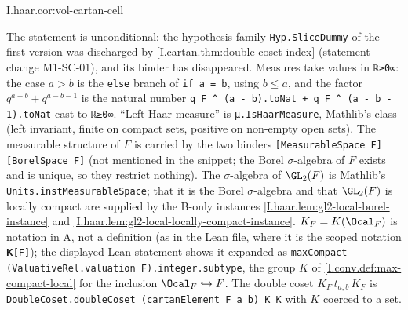 \begin{tfformal}{I.haar.cor:vol-cartan-cell}
\begin{tffidelity}
The statement is unconditional: the hypothesis family \texttt{Hyp.SliceDummy} of the first version was discharged by \cref{I.cartan.thm:double-coset-index} (statement change M1-SC-01), and its binder has disappeared. Measures take values in \texttt{ℝ≥0∞}: the case $a>b$ is the \texttt{else} branch of \texttt{if a = b}, using $b\le a$, and the factor $q^{a-b}+q^{a-b-1}$ is the natural number \texttt{q F \^{} (a - b).toNat + q F \^{} (a - b - 1).toNat} cast to \texttt{ℝ≥0∞}. ``Left Haar measure'' is \texttt{μ.IsHaarMeasure}, Mathlib's class (left invariant, finite on compact sets, positive on non-empty open sets). The measurable structure of $F$ is carried by the two binders \texttt{[MeasurableSpace F] [BorelSpace F]} (not mentioned in the snippet; the Borel $\sigma$-algebra of $F$ exists and is unique, so they restrict nothing). The $\sigma$-algebra of $\GL_2(F)$ is Mathlib's \texttt{Units.instMeasurableSpace}; that it is the Borel $\sigma$-algebra and that $\GL_2(F)$ is locally compact are supplied by the B-only instances \cref{I.haar.lem:gl2-local-borel-instance} and \cref{I.haar.lem:gl2-local-locally-compact-instance}. $K_F=K(\Ocal_F)$ is notation in A, not a definition (as in the Lean file, where it is the scoped notation \texttt{𝐊[F]}); the displayed Lean statement shows it expanded as \texttt{maxCompact (ValuativeRel.valuation F).integer.subtype}, the group $K$ of \cref{I.conv.def:max-compact-local} for the inclusion $\Ocal_F\hookrightarrow F$. The double coset $K_F\,t_{a,b}\,K_F$ is \texttt{DoubleCoset.doubleCoset (cartanElement F a b) K K} with $K$ coerced to a set.
\end{tffidelity}
\end{tfformal}
